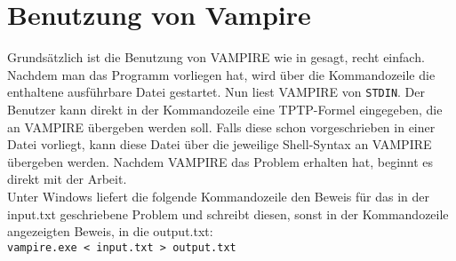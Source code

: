 \documentclass{article}
\begin{document}
\section{Benutzung von Vampire}
\label{sec:invocation}

Grundsätzlich ist die Benutzung von VAMPIRE wie in \cite{cav2013} gesagt, recht einfach. Nachdem man das Programm vorliegen hat, wird über die Kommandozeile die enthaltene ausführbare Datei gestartet. Nun liest VAMPIRE von \texttt{STDIN}. Der Benutzer kann direkt in der Kommandozeile eine TPTP-Formel eingegeben, die an VAMPIRE übergeben werden soll. Falls diese schon vorgeschrieben in einer Datei vorliegt, kann diese Datei über die jeweilige Shell-Syntax an VAMPIRE übergeben werden. Nachdem VAMPIRE das Problem erhalten hat, beginnt es direkt mit der Arbeit.\\
Unter Windows liefert die folgende Kommandozeile den Beweis für das in der input.txt geschriebene Problem und schreibt diesen, sonst in der Kommandozeile angezeigten Beweis, in die output.txt:\\


\texttt{vampire.exe < input.txt > output.txt}
\end{document}
